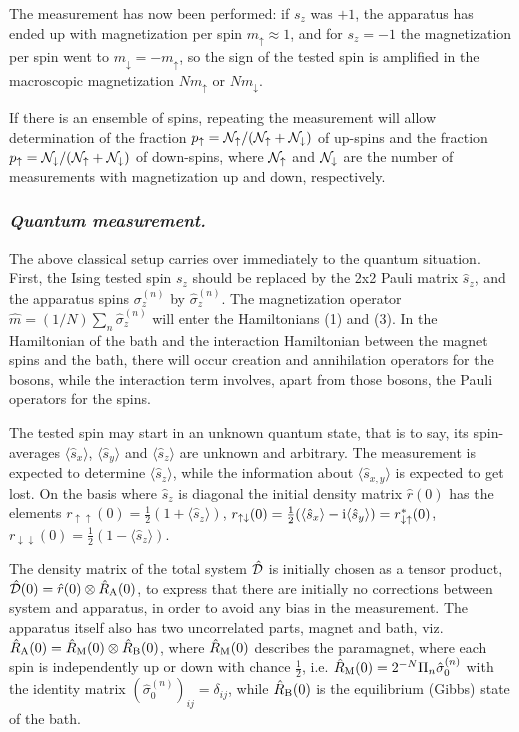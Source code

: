 \documentclass[aps,prb,floatfix,twocolumn]{revtex4}
\newcommand{\N}{{\cal N}}
\newcommand{\RA}{{\rm A}}
\newcommand{\RM}{{\rm M}}
\newcommand{\RB}{{\rm B}}
\newcommand{\down}{{\downarrow}}
\newcommand{\up}{{\uparrow}}
\newcommand{\uu}{{\uparrow\uparrow}}
\newcommand{\dd}{{\downarrow\downarrow}}
\newcommand{\ud}{{\uparrow\downarrow}}
\newcommand{\du}{{\downarrow\uparrow}}
\newcommand{\ri}{{\rm i}}
\newcommand{\half}{\frac{1}{2}}
\newcommand{\CD}{{\cal D}}
\begin{document}
The measurement has now been performed: if $s_z$ was $+1$, the apparatus has 
ended up with magnetization per spin $m_\up\approx 1$, and for $s_z=-1$ the 
magnetization per spin went to $m_\down=-m_\up$, so the sign of the tested spin 
is amplified in the macroscopic magnetization $Nm_\up$ or $Nm_\down$.

If there is an ensemble of spins, 
repeating the measurement will allow determination of the fraction
$p_\up=\N_\up/(\N_\up+\N_\down)$ of up-spins and the fraction
$p_\up=\N_\down/(\N_\up+\N_\down)$ of down-spins, where 
$\N_\up$ and $\N_\down$ are the number of measurements with magnetization
up and down, respectively.


\subsubsection*{\it Quantum measurement.} 

The above classical setup carries over immediately to the quantum 
situation. 
First, the Ising tested spin $s_z$ should be replaced by the 2x2 Pauli matrix 
$\hat s_z$, and the apparatus spins $\sigma_z^{(n)}$ by  $\hat \sigma_z^{(n)}$.
The magnetization operator $\hat m=(1/N)\sum_n \hat \sigma_z^{(n)}$ will
enter the Hamiltonians (1) and (3). In the Hamiltonian of the bath
and the interaction Hamiltonian between the magnet spins and the bath,
there will occur creation and annihilation operators for the bosons,
while the interaction term involves, apart from  those bosons,
the Pauli operators for the spins.

The tested spin may start in an unknown quantum state, that is to say, its
 spin-averages $\langle\hat s_x\rangle$, $\langle\hat s_y\rangle$ and 
$\langle\hat s_z\rangle$  are unknown and arbitrary. 
The measurement is expected to determine $\langle\hat s_z\rangle$, while the
information about  $\langle\hat s_{x,y}\rangle$ is expected to get lost. 
On the basis where $\hat s_z$ is diagonal 
the initial density matrix $\hat r(0)$ has the elements 
$r_{\uu}(0)=\half(1+\langle\hat s_z\rangle)$,   
$r_\ud(0)=\half(\langle\hat s_x\rangle-\ri\langle\hat 
s_y\rangle)=r_\du^\ast(0)$, $r_\dd(0)=\half(1-\langle\hat s_z\rangle)$.

The density matrix of the total system $\hat \CD$ is initially chosen as
a tensor product, $\hat\CD(0)=\hat r(0)\otimes \hat R_\RA(0)$,
 to express that there are initially no corrections between system and apparatus,
in order to avoid any bias in the measurement. 
The apparatus itself also has two uncorrelated parts, magnet and bath, viz.
$\hat R_\RA(0)=\hat R_\RM(0)\otimes \hat R_\RB(0)$, where 
$\hat R_\RM(0)$ describes the paramagnet, 
where each spin is independently up or down with chance $\half$, i.e.
 $\hat R_\RM(0)=2^{-N}\Pi_n \hat\sigma_0^{(n)}$ with 
the identity matrix $(\hat\sigma_0^{(n)})_{ij}=\delta_{ij}$,
while $\hat R_\RB(0)$ is the equilibrium (Gibbs) state of the bath.
\end{document}
